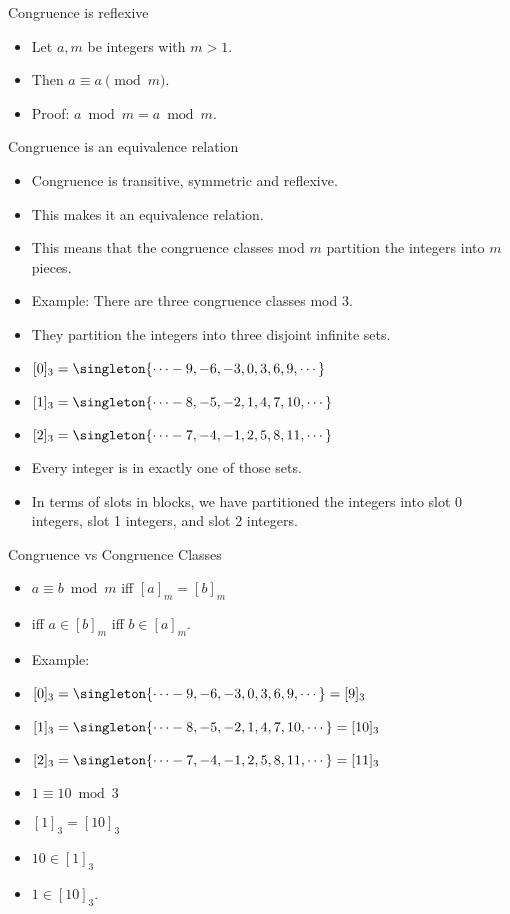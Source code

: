 \documentclass[handout]{beamer}
\begin{document}
\begin{frame}{Congruence is reflexive}

\begin{itemize}
  \item  Let $a, m$ be integers with $m>1$.
  \item Then $a\equiv a \pmod m$.
  \item Proof: $a \bmod m = a \bmod m$.
\end{itemize}

\end{frame}


\begin{frame}{Congruence is an equivalence relation}

\begin{itemize}
  \item  Congruence is transitive, symmetric and reflexive.
  \item This makes it an equivalence relation.
  \item This means that the congruence classes mod $m$ partition the integers into $m$ pieces.
  \item Example: There are three congruence classes mod 3.
  \item They partition the integers into three disjoint infinite sets.
  \item $[0]_3 = \singleton{\cdots -9, -6, -3, 0, 3, 6, 9,\cdots}$
  \item $[1]_3 = \singleton{\cdots -8, -5, -2, 1, 4, 7, 10,\cdots}$
  \item $[2]_3 = \singleton{\cdots -7, -4, -1, 2, 5, 8, 11,\cdots}$
  \item Every integer is in exactly one of those sets.
  \item In terms of slots in blocks, we have partitioned the integers into slot 0 integers,
  slot 1 integers, and slot 2 integers.
\end{itemize}

\end{frame}


\begin{frame}{Congruence vs Congruence Classes}

\begin{itemize}
  \item  $a\equiv b \bmod m$ iff $[a]_m = [b]_m$
  \item iff $a\in[b]_m$ iff $b\in[a]_m$.
  \item Example:
  \item $[0]_3 = \singleton{\cdots -9, -6, -3, 0, 3, 6, 9,\cdots} = [9]_3$
  \item $[1]_3 = \singleton{\cdots -8, -5, -2, 1, 4, 7, 10,\cdots} =[10]_3$
  \item $[2]_3 = \singleton{\cdots -7, -4, -1, 2, 5, 8, 11,\cdots} = [11]_3$
  \item $1 \equiv 10 \bmod 3$
  \item $[1]_3 = [10]_3$
  \item $10\in [1]_3$
  \item $1\in[10]_3$.
\end{itemize}

\end{frame}
\end{document}

